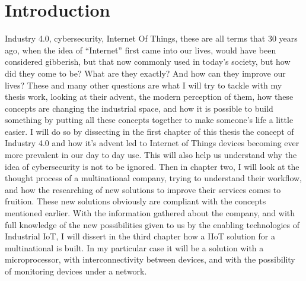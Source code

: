\documentclass[a4paper, 12pt]{book}
\begin{document}
\chapter{Introduction}
\pagestyle{fancy}
\fancyhf{}
\renewcommand{\headrulewidth}{2pt}
\fancyhead[EL]{\textbf{\textsf{\nouppercase\thepage}}}
\fancyhead[ER]{\textbf{\textsf{\nouppercase\leftmark}}}
\fancyhead[OR]{\textbf{\textsf{\nouppercase\thepage}}}
\fancyhead[OL]{\textbf{\textsf{\nouppercase {\rightmark}}}}

Industry 4.0, cybersecurity, Internet Of Things, these are all terms that 30 years ago,
when the idea of “Internet” first came into our lives, would have been considered
gibberish, but that now commonly used in today’s society, but how did they come to
be? What are they exactly? And how can they improve our lives? These and many
other questions are what I will try to tackle with my thesis work, looking at their
advent, the modern perception of them, how these concepts are changing the
industrial space, and how it is possible to build something by putting all these
concepts together to make someone’s life a little easier.
I will do so by dissecting in the first chapter of this thesis the concept of Industry 4.0
and how it’s advent led to Internet of Things devices becoming ever more prevalent
in our day to day use. This will also help us understand why the idea of cybersecurity
is not to be ignored. Then in chapter two, I will look at the thought process of a
multinational company, trying to understand their workflow, and how the researching
of new solutions to improve their services comes to fruition. These new solutions
obviously are compliant with the concepts mentioned earlier. With the information
gathered about the company, and with full knowledge of the new possibilities given
to us by the enabling technologies of Industrial IoT, I will dissert in the third chapter
how a IIoT solution for a multinational is built. In my particular case it will be a
solution with a microprocessor, with interconnectivity between devices, and with the
possibility of monitoring devices under a network.

\thispagestyle{empty}

\newpage
\end{document}
